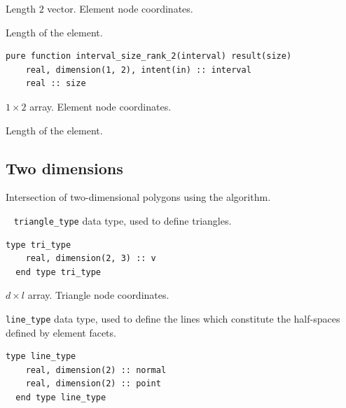 \documentclass{article}
\begin{document}
\begin{description}[font=\ttfamily\bfseries,leftmargin=2.2\parindent,labelindent=1.7\parindent,noitemsep]
  \item[interval] Length $2$ vector. Element node coordinates.
  \item[size] Length of the element.
\end{description}
  
\begin{lstlisting}[language=FORTRAN]    
  pure function interval_size_rank_2(interval) result(size)
    real, dimension(1, 2), intent(in) :: interval
    real :: size
\end{lstlisting} 

\begin{description}[font=\ttfamily\bfseries,leftmargin=2.2\parindent,labelindent=1.7\parindent,noitemsep]
  \item[interval] $1 \times 2$ array. Element node coordinates.
  \item[size] Length of the element.
\end{description}

\subsection{Two dimensions}\label{sect:2D_intersection}

Intersection of two-dimensional polygons using the \citet{sutherland1974}
algorithm.

~\newline
\verb+triangle_type+ data type, used to define triangles.

\begin{lstlisting}[language=FORTRAN]    
  type tri_type
    real, dimension(2, 3) :: v
  end type tri_type
\end{lstlisting} 

\begin{description}[font=\ttfamily\bfseries,leftmargin=2.2\parindent,labelindent=1.7\parindent,noitemsep]
  \item[v] $d \times l$ array. Triangle node coordinates.
\end{description}

\noindent \verb+line_type+ data type, used to define the lines which constitute
the half-spaces defined by element facets.

\begin{lstlisting}[language=FORTRAN]   
  type line_type
    real, dimension(2) :: normal
    real, dimension(2) :: point
  end type line_type
\end{lstlisting} 
\end{document}
